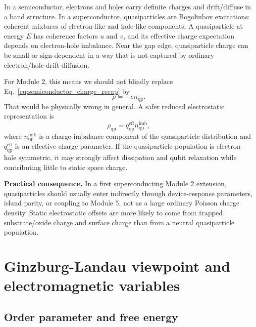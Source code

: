 \documentclass[11pt]{article}
\newcommand{\rhoqp}{\rho_{\mathrm{qp}}}
\begin{document}
In a semiconductor, electrons and holes carry definite charges and drift/diffuse in a band structure. In a superconductor, quasiparticles are Bogoliubov excitations: coherent mixtures of electron-like and hole-like components. A quasiparticle at energy $E$ has coherence factors $u$ and $v$, and its effective charge expectation depends on electron-hole imbalance. Near the gap edge, quasiparticle charge can be small or sign-dependent in a way that is not captured by ordinary electron/hole drift-diffusion.

For Module 2, this means we should not blindly replace Eq.~\eqref{eq:semiconductor_charge_recap} by
\begin{equation}
\rho=-e n_{\mathrm{qp}}.
\end{equation}
That would be physically wrong in general. A safer reduced electrostatic representation is
\begin{equation}
\rhoqp = q_{\mathrm{qp}}^{\mathrm{eff}} n_{\mathrm{qp}}^{\mathrm{imb}},
\label{eq:qp_charge_density}
\end{equation}
where $n_{\mathrm{qp}}^{\mathrm{imb}}$ is a charge-imbalance component of the quasiparticle distribution and $q_{\mathrm{qp}}^{\mathrm{eff}}$ is an effective charge parameter. If the quasiparticle population is electron-hole symmetric, it may strongly affect dissipation and qubit relaxation while contributing little to static space charge.

\begin{notebox}
\textbf{Practical consequence.} In a first superconducting Module 2 extension, quasiparticles should usually enter indirectly through device-response parameters, island parity, or coupling to Module 5, not as a large ordinary Poisson charge density. Static electrostatic offsets are more likely to come from trapped substrate/oxide charge and surface charge than from a neutral quasiparticle population.
\end{notebox}

\section{Ginzburg-Landau viewpoint and electromagnetic variables}

\subsection{Order parameter and free energy}
\end{document}
